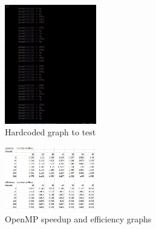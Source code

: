 \documentclass{article}
\begin{document}
\begin{figure}
    \centering
    \includegraphics[width=4cm]{TestInput.JPG}
    \caption{Hardcoded graph to test}
    \label{fig:my_label}
\end{figure}

\begin{figure}
    \centering
    \includegraphics[width=4cm]{OpenMPTables.JPG}
    \caption{OpenMP speedup and efficiency graphs}
    \label{fig:my_label}
\end{figure}
\end{document}
